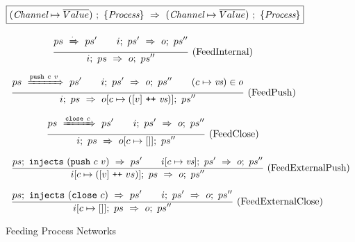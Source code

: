 
\begin{figure}

\newcommand\vs {\ti{vs}}
\newcommand\ps {\ti{ps}}

$$
  \boxed{
    (\textit{Channel} \mapsto \overline{Value})~;~\{ \textit{Process} \}~\Rightarrow~(\textit{Channel} \mapsto \overline{Value})~;~\{ \textit{Process} \}
  }
$$

$$
\enskip \frac {\displaystyle 
  ps~\xRightarrow{\cdot}~ps'
\qquad
  i;~ps'~\Rightarrow~o;~ps''
} {\displaystyle 
  i;~ps~\Rightarrow~o;~ps''
} \  \mbox{(FeedInternal)} \enskip
$$

$$
\ruleIN{
  \ProcsShake
    {ps}
    {\Push~c~v}
    {ps'}
\qquad
  \ProcsFeed
    {i}
    {ps'}
    {o}
    {ps''}
\qquad
  (c \mapsto \vs) \in o
}{
  \ProcsFeed
    {i}
    {ps}
    {o[c \mapsto ([v] \listappend \vs)]}
    {ps''}
}{FeedPush}
$$

$$
\enskip \frac {\displaystyle 
  ps~\xRightarrow{\texttt{close}~c}~ps'
\qquad
  i;~ps'~\Rightarrow~o;~ps''
} {\displaystyle 
  i;~ps~\Rightarrow~o[c \mapsto []];~ps''
} \  \mbox{(FeedClose)} \enskip
$$





$$
\ruleIN{
  \ProcsInject
    {ps}
    {(\Push~c~v)}
    {ps'}
\qquad
  \ProcsFeed
    {i[c \mapsto \vs]}
    {ps'}
    {o}
    {ps''}
}{
  \ProcsFeed
    {i[c \mapsto ([v] \listappend vs)]}
    {ps}
    {o}
    {ps''}
}{FeedExternalPush}
$$

$$
\enskip \frac {\displaystyle 
  ps;~\texttt{injects}~(\texttt{close}~c)~\Rightarrow~ps'
\qquad
  i;~ps'~\Rightarrow~o;~ps''
} {\displaystyle 
  i[c \mapsto [] ];~ps~\Rightarrow~o;~ps''
} \  \mbox{(FeedExternalClose)} \enskip
$$



\caption{Feeding Process Networks}
\label{fig:Process:Eval:Feed}
\end{figure}

